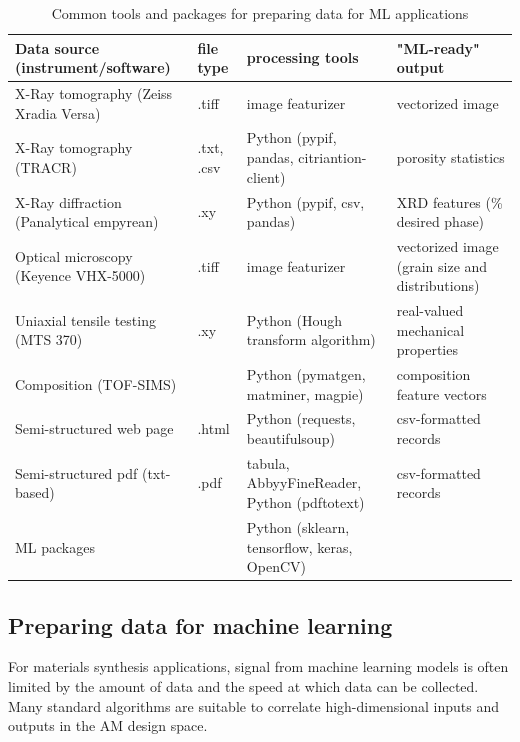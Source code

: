 \begin{table}
    \renewcommand{\arraystretch}{0.8}
    \setlength{\tabcolsep}{5pt}
    \begin{center}
        \begin{tabular}{@{}llll@{}}
            \toprule
            Data source (instrument/software) & file type & processing tools & "ML-ready" output \\ \midrule
            \hline
            \hline
            X-Ray tomography (Zeiss Xradia Versa) & .tiff & image featurizer & vectorized image \\
            X-Ray tomography (TRACR) & .txt, .csv & Python (pypif, pandas, citriantion-client) & porosity statistics \\
            X-Ray diffraction (Panalytical empyrean) & .xy & Python (pypif, csv, pandas) & XRD features (\% desired phase) \\
            Optical microscopy (Keyence VHX-5000) & .tiff & image featurizer & vectorized image (grain size and distributions) \\
            Uniaxial tensile testing (MTS 370) & .xy & Python (Hough transform algorithm) & real-valued mechanical properties \\
            Composition (TOF-SIMS) & & Python (pymatgen, matminer, magpie) & composition feature vectors \\
            Semi-structured web page & .html & Python (requests, beautifulsoup) & csv-formatted records \\
            Semi-structured pdf (txt-based) & .pdf & tabula, AbbyyFineReader, Python (pdftotext) & csv-formatted records \\
            ML packages & & Python (sklearn, tensorflow, keras, OpenCV) & \\
            \hline
            \bottomrule
        \end{tabular}
        \caption{Common tools and packages for preparing data for ML applications}
        \label{table:data_tools}
    \end{center}
\end{table}


\subsection{Preparing data for machine learning}

For materials synthesis applications, signal from machine learning models is often limited by the amount of data and the speed at which data can be collected.
Many standard algorithms are suitable to correlate high-dimensional inputs and outputs in the AM design space.

